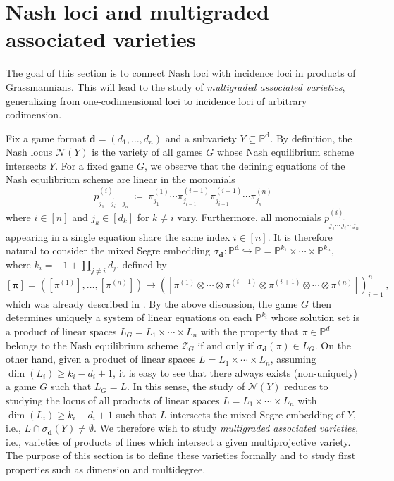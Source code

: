 \documentclass[12pt]{article}
\theoremstyle{definition}
\newenvironment{example}
{\pushQED{\qed}\renewcommand{\qedsymbol}{$\diamond$}\examplex}
{\popQED\endexamplex}
\newcommand{\PP}{{\mathbb P}}
\def\bd{{\boldsymbol{d}}}
\def\bpi{{\boldsymbol{\pi}}}
\newcommand{\kn}{{\mathcal N}}
\newcommand{\kz}{{\mathcal Z}}
\begin{document}
\begin{example}
\end{example}


\section{Nash loci and multigraded associated varieties}\label{sec: multigraded associated varieties}

The goal of this section is to connect Nash loci with incidence loci in products of Grassmannians. This will lead to the study of {\em multigraded associated varieties}, generalizing \cite{osserman2019multigraded} from one-codimensional loci to incidence loci of arbitrary codimension.

\medskip

Fix a game format $\bd=(d_1,\dots,d_n)$ and a subvariety $Y\subseteq \PP^\bd$. By definition, the Nash locus $\kn(Y)$ is the variety of all games $G$ whose Nash equilibrium scheme intersects $Y$. For a fixed game $G$, we observe that the defining equations of the Nash equilibrium scheme are linear in the monomials
\[
    p^{(i)}_{j_1\cdots\,\hat{j_i}\,\cdots j_n}\ \coloneqq\ \pi_{j_1}^{(1)}\cdots \pi_{j_{i-1}}^{(i-1)}\pi_{j_{i+1}}^{(i+1)}\cdots \pi_{j_n}^{(n)}
\]
where $i\in [n]$ and $j_k\in [d_k]$ for $k\neq i$ vary. Furthermore, all monomials $p^{(i)}_{j_1\cdots\,\hat{j_i}\,\cdots j_n}$ appearing in a single equation share the same index $i\in [n]$. It is therefore natural to consider the mixed Segre embedding $\sigma_\bd\colon\PP^\bd\hookrightarrow\PP=\PP^{k_1}\times\cdots\times\PP^{k_n}$, where $k_i=-1+\prod_{j\neq i}d_j$, defined by
\begin{equation}\label{eq: segre}
    [\bpi]=([\pi^{(1)}],\ldots,[\pi^{(n)}])\longmapsto\left([\pi^{(1)}\otimes\cdots\otimes\pi^{(i-1)}\otimes\pi^{(i+1)}\otimes\cdots\otimes\pi^{(n)}]\right)_{i=1}^n\,,
\end{equation}
which was already described in \cite[\S 5]{pratt2026multigraded}.
By the above discussion, the game $G$ then determines uniquely a system of linear equations on each $\PP^{k_i}$ whose solution set is a product of linear spaces $L_G=L_1\times \cdots \times L_n$ with the property that $\pi\in \PP^d$ belongs to the Nash equilibrium scheme $\kz_G$ if and only if $\sigma_\bd(\pi)\in L_G$. On the other hand, given a product of linear spaces $L=L_1\times \cdots \times L_n$, assuming $\dim(L_i)\geq k_i-d_i+1$, it is easy to see that there always exists (non-uniquely) a game $G$ such that $L_G=L$. In this sense, the study of $\kn(Y)$ reduces to studying the locus of all products of linear spaces $L=L_1\times \cdots \times L_n$ with $\dim(L_i)\geq k_i-d_i+1$ such that $L$ intersects the mixed Segre embedding of $Y$, i.e., $L\cap \sigma_\bd(Y)\neq \emptyset$. We therefore wish to study {\em multigraded associated varieties}, i.e., varieties of products of lines which intersect a given multiprojective variety. The purpose of this section is to define these varieties formally and to study first properties such as dimension and multidegree.
\end{document}
